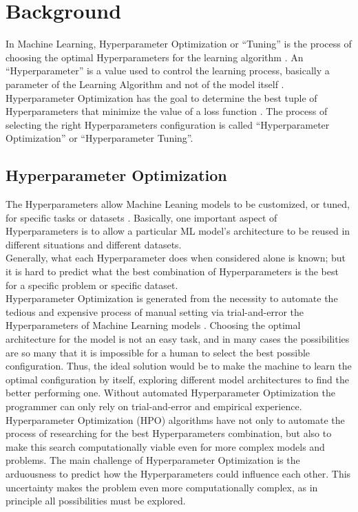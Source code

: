 \chapter{Background}

In Machine Learning, Hyperparameter Optimization or “Tuning” is the process of choosing the optimal Hyperparameters for the learning algorithm \cite{Tesi-1.10}.
An “Hyperparameter” is a value used to control the learning process, basically a parameter of the Learning Algorithm and not of the model itself \cite{Tesi-1.6}.
\\[0.3cm]Hyperparameter Optimization has the goal to determine the best tuple of Hyperparameters that minimize the value of a loss function \cite{Tesi-1.1}.
The process of selecting the right Hyperparameters configuration is called “Hyperparameter Optimization” or “Hyperparameter Tuning”.


\section{Hyperparameter Optimization}

The Hyperparameters allow Machine Leaning models to be customized, or tuned, for specific tasks or datasets \cite{Tesi-1.6}.
Basically, one important aspect of Hyperparameters is to allow a particular ML model's architecture to be reused in different situations and different datasets.
\\[0.3cm]Generally, what each Hyperparameter does when considered alone is known; but it is hard to predict what the best combination of Hyperparameters is the best for a specific problem or specific dataset.
%
%
\\[0.3cm]Hyperparameter Optimization is generated from the necessity to automate the tedious and expensive process of manual setting via trial-and-error the Hyperparameters of Machine Learning models \cite{Tesi-1.6}.
Choosing the optimal architecture for the model is not an easy task, and in many cases the possibilities are so many that it is impossible for a human to select the best possible configuration.
Thus, the ideal solution would be to make the machine to learn the optimal configuration by itself, exploring different model architectures to find the better performing one.
Without automated Hyperparameter Optimization the programmer can only rely on trial-and-error and empirical experience.
\\[0.3cm]Hyperparameter Optimization (HPO) algorithms have not only to automate the process of researching for the best Hyperparameters combination, but also to make this search computationally viable even for more complex models and problems.
The main challenge of Hyperparameter Optimization is the arduousness to predict how the Hyperparameters could influence each other. This uncertainty makes the problem even more computationally complex, as in principle all possibilities must be explored. 

